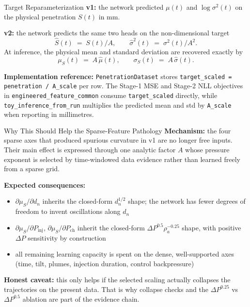 \documentclass[UTF8,aspectratio=169]{ctexbeamer}
\begin{document}
\begin{frame}{Target Reparameterization}
\textbf{v1:} the network predicted $\mu(t)$ and $\log\sigma^2(t)$ on the physical penetration $S(t)$ in mm.

\vspace{0.3em}
\textbf{v2:} the network predicts the same two heads on the non-dimensional target
\[
\hat S(t)\;=\;S(t)/A,\qquad
\hat\sigma^2(t)\;=\;\sigma^2(t)/A^{2}.
\]
At inference, the physical mean and standard deviation are recovered exactly by
\[
\mu_S(t)\;=\;A\,\hat\mu(t),\qquad
\sigma_S(t)\;=\;A\,\hat\sigma(t).
\]

\vspace{0.3em}
\textbf{Implementation reference:} \texttt{PenetrationDataset} stores \texttt{target\_scaled = penetration / A\_scale} per row. The Stage-1 MSE and Stage-2 NLL objectives in \texttt{engineered\_feature\_common} consume \texttt{target\_scaled} directly, while \texttt{toy\_inference\_from\_run} multiplies the predicted mean and std by \texttt{A\_scale} when reporting in millimetres.
\end{frame}

\begin{frame}{Why This Should Help the Sparse-Feature Pathology}
\textbf{Mechanism:} the four sparse axes that produced spurious curvature in v1 are no longer free inputs. Their main effect is expressed through one analytic factor $A$ whose pressure exponent is selected by time-windowed data evidence rather than learned freely from a sparse grid.

\vspace{0.4em}
\textbf{Expected consequences:}
\begin{itemize}
  \item $\partial\mu_S/\partial d_n$ inherits the closed-form $d_n^{1/2}$ shape; the network has fewer degrees of freedom to invent oscillations along $d_n$
  \item $\partial\mu_S/\partial P_{\mathrm{inj}}$, $\partial\mu_S/\partial P_{\mathrm{ch}}$ inherit the closed-form \(\Delta P^{0.5}\rho_a^{-0.25}\) shape, with positive \(\Delta P\) sensitivity by construction
  \item all remaining learning capacity is spent on the dense, well-supported axes (time, tilt, plumes, injection duration, control backpressure)
\end{itemize}

\vspace{0.3em}
\textbf{Honest caveat:} this only helps if the selected scaling actually collapses the trajectories on the present data. That is why collapse checks and the \(\Delta P^{0.25}\) vs \(\Delta P^{0.5}\) ablation are part of the evidence chain.
\end{frame}
\end{document}
